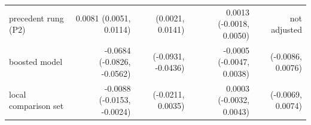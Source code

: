 \begin{tabular}{lrrrr}
precedent rung (P2) & 0.0081 (0.0051, 0.0114) & (0.0021, 0.0141) & 0.0013 (-0.0018, 0.0050) & not adjusted \\
boosted model & -0.0684 (-0.0826, -0.0562) & (-0.0931, -0.0436) & -0.0005 (-0.0047, 0.0038) & (-0.0086, 0.0076) \\
local comparison set & -0.0088 (-0.0153, -0.0024) & (-0.0211, 0.0035) & 0.0003 (-0.0032, 0.0043) & (-0.0069, 0.0074) \\

\end{tabular}
